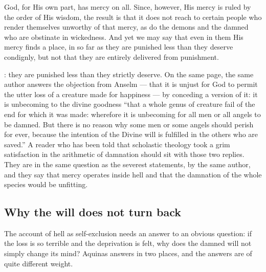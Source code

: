 \begin{studyframe}
God, for His own part, has mercy on all. Since, however, His mercy is ruled by the order of His wisdom, the result is that it does not reach to certain people who render themselves unworthy of that mercy, as do the demons and the damned who are obstinate in wickedness. And yet we may say that even in them His mercy finds a place, in so far as they are punished less than they deserve condignly, but not that they are entirely delivered from punishment.
\end{studyframe}

: they are punished less than they strictly deserve. On the same page, the same author answers the objection from Anselm --- that it is unjust for God to permit the utter loss of a creature made for happiness --- by conceding a version of it: it is unbecoming to the divine goodness ``that a whole genus of creature fail of the end for which it was made: wherefore it is unbecoming for all men or all angels to be damned. But there is no reason why some men or some angels should perish for ever, because the intention of the Divine will is fulfilled in the others who are saved.'' A reader who has been told that scholastic theology took a grim satisfaction in the arithmetic of damnation should sit with those two replies. They are in the same question as the severest statements, by the same author, and they say that mercy operates inside hell and that the damnation of the whole species would be unfitting.

\subsection{Why the will does not turn back}

The account of hell as self-exclusion needs an answer to an obvious question: if the loss is so terrible and the deprivation is felt, why does the damned will not simply change its mind? Aquinas answers in two places, and the answers are of quite different weight.

